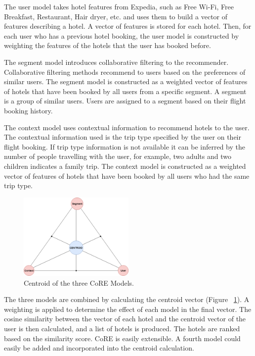 The user model takes hotel features from Expedia, such as Free Wi-Fi, Free Breakfast, Restaurant, Hair dryer, etc. and uses them to build a vector of features describing a hotel. A vector of features is stored for each hotel. Then, for each user who has a previous hotel booking, the user model is constructed by weighting the features of the hotels that the user has booked before.

The segment model introduces collaborative filtering to the recommender. Collaborative filtering methods recommend to users based on the preferences of similar users. The segment model is constructed as a weighted vector of features of hotels that have been booked by all users from a specific segment. A segment is a group of similar users. Users are assigned to a segment based on their flight booking history.

The context model uses contextual information to recommend hotels to the user. The contextual information used is the trip type specified by the user on their flight booking. If trip type information is not available it can be inferred by the number of people travelling with the user, for example, two adults and two children indicates a family trip. The context model is constructed as a weighted vector of features of hotels that have been booked by all users who had the same trip type.

\begin{figure}[h!]
\centering
\includegraphics[width=0.5\textwidth]{design_and_methodology/centroid.png}
\caption{\label{fig:centroid} Centroid of the three CoRE Models.}
\end{figure}

The three models are combined by calculating the centroid vector (Figure ~\ref{fig:centroid}). A weighting is applied to determine the effect of each model in the final vector. The cosine similarity between the vector of each hotel and the centroid vector of the user is then calculated, and a list of hotels is produced. The hotels are ranked based on the similarity score. CoRE is easily extensible. A fourth model could easily be added and incorporated into the centroid calculation.

